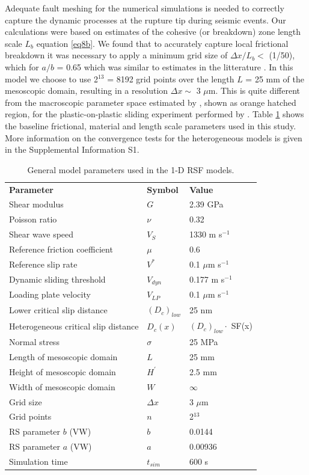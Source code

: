 \documentclass[preprint,1p, 10pt,authoryear]{elsarticle}
\begin{document}
Adequate fault meshing for the numerical simulations is needed to correctly capture the dynamic processes at the rupture tip during seismic events. Our calculations were based on estimates of the cohesive (or breakdown) zone length scale $L_{b}$  equation \eqref{eq8b}. We found that to accurately capture local frictional breakdown it was necessary to apply a minimum grid size of $\Delta x/L_{b} <$ (1/50), which for $a/b$ = 0.65 which was similar to estimates in the litterature \citep{Rubin2005,Ampuero2008}.  In this model we choose to use 2$^{13}$ = 8192 grid points over the length $L$ = 25 mm of the mesoscopic domain, resulting in a resolution $\Delta x \sim$  3 $\mu$m. This is quite different from the macroscopic parameter space estimated by \citet{Kaneko2016}, shown as orange hatched region, for the plastic-on-plastic sliding experiment performed by \citet{Latour2013}. Table \ref{table1} shows the baseline frictional, material and length scale parameters used in this study. More information on the convergence tests for the heterogeneous models is given in the Supplemental Information S1.

\begin{table}[ht]
	\centering
	\caption{General model parameters used in the 1-D RSF models.}
	\begin{tabular}{ m{5cm} m{2cm} m{4cm}} 
		\hline  
		\bf{Parameter} 			& \bf{Symbol} 		& \bf{Value}	\\
		Shear modulus  			& $G$  		 	& 2.39 GPa		\\
		Poisson ratio  			& $\nu$  	 	& 0.32 		\\
		Shear wave speed		& $V_{S}$      		& 1330 m s$^{-1}$	\\
		Reference friction coefficient	& $\mu$	        & 0.6	\\
		Reference slip rate  		& $V^{*}$     		&  0.1 $\mu$m s$^{-1}$\\
		Dynamic sliding threshold   	& $V_{dyn}$  		& 0.177 m s$^{-1}$ \\
		Loading plate velocity  	& $V_{LP}$     		&  0.1 $\mu$m s$^{-1}$\\
		Lower critical slip distance 	& $\left(D_{c}\right)_{low}$    &  25 nm\\
        Heterogeneous critical slip distance 	& $D_{c}(x)$    &  $\left(D_{c}\right)_{low} \cdot$ SF(x)\\
  		Normal stress 			& $\sigma$  		&  25 MPa \\
		Length of mesoscopic domain 	&   $L$  		& 25 mm\\
		Height of mesoscopic domain 	&   $H^{'}$  		& 2.5 mm\\
		Width of mesoscopic domain 	&   $W$   		& $\infty$\\
		Grid size 			& $\Delta x$ 		& 3 $\mu$m \\
		Grid points 			& $n$ 			& 2$^{13}$ \\
		RS parameter $b$ (VW)  		& $b$ 			& 0.0144  \\
		RS parameter $a$ (VW)  		& $a$ 			& 0.00936  \\
	    Simulation time 			& $t_{sim}$ 		& 600 s  \\
		\hline  	
	\end{tabular}
	\label{table1}
\end{table}
\end{document}
